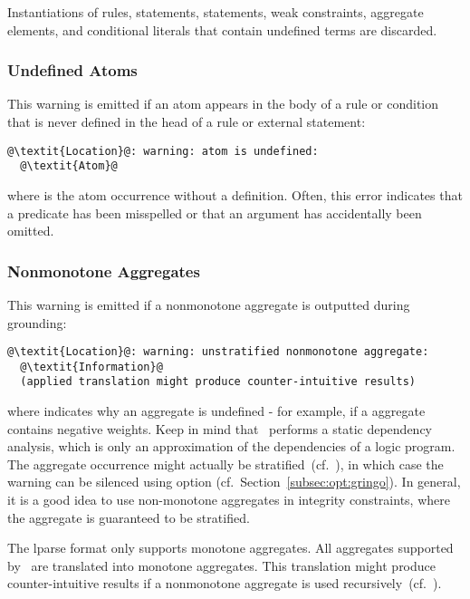 \begin{note}
Instantiations of rules,  statements,  statements, weak constraints, aggregate elements, and conditional literals
that contain undefined terms are discarded.
\end{note}

\subsubsection{Undefined Atoms}\label{sec:warn:undefatm}
This warning is emitted if an atom appears in the body of a rule or condition
that is never defined in the head of a rule or external statement:
\begin{lstlisting}[numbers=none,escapechar=@]
@\textit{Location}@: warning: atom is undefined:
  @\textit{Atom}@
\end{lstlisting}
%
where  is the atom occurrence without a definition.
Often, this error indicates that a predicate has been misspelled 
or that an argument has accidentally been omitted.

\subsubsection{Nonmonotone Aggregates}\label{sec:warn:nonmon}
This warning is emitted if a nonmonotone aggregate is outputted during grounding:
\begin{lstlisting}[numbers=none,escapechar=@]
@\textit{Location}@: warning: unstratified nonmonotone aggregate:
  @\textit{Information}@
  (applied translation might produce counter-intuitive results)
\end{lstlisting}
where  indicates why an aggregate is undefined
- for example, if a  aggregate contains negative weights.
Keep in mind that \gringo\ performs a static dependency analysis,
which is only an approximation of the dependencies of a logic program.
The aggregate occurrence might actually be stratified~(cf.~\cite{twgng03,aspcore2}),
in which case the warning can be silenced using option  (cf.~Section~\ref{subsec:opt:gringo}).
In general, it is a good idea to use non-monotone aggregates in integrity constraints,
where the aggregate is guaranteed to be stratified.

\begin{note}
The lparse format only supports monotone aggregates.
All aggregates supported by \gringo\ are translated into monotone aggregates.
This translation might produce counter-intuitive results
if a nonmonotone aggregate is used recursively~(cf.~\cite{ferlif05a}).
\end{note}

